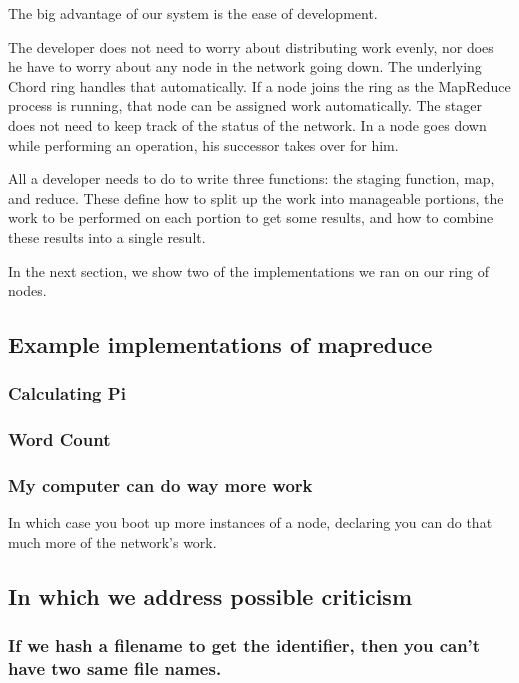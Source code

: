 \documentclass[conference, compsocconf, letterpaper]{IEEEtran}
\begin{document}
The big advantage of our system is the ease of development.  

The developer does not need to worry about distributing work evenly, nor does he have to worry about any node in the network going down.  The underlying Chord ring handles that automatically.  If a node joins the ring as the MapReduce process is running, that node can be assigned work automatically.  The stager does not need to keep track of the status of the network.  In a node goes down while performing an operation, his successor takes over for him.

All a developer needs to do to write three functions: the staging function, map, and reduce.  These define how to split up the work into manageable portions,  the  work to be performed on each portion to get some results, and how to combine these results into a single result. 

In the next section, we show two of the implementations we ran on our ring of nodes.

\subsection{Example implementations of mapreduce}

\subsubsection{Calculating Pi}

\subsubsection{Word Count}

\subsubsection{My computer can do way more work}  In which case you boot up more instances of a node, declaring you can do that much more of the network's work.


\subsection{In which we address possible criticism}




\subsubsection{If we hash a filename to get the identifier, then you can't have two same file names.}
\end{document}
